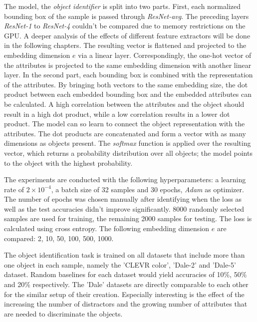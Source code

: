 The model, the \emph{object identifier} is split into two parts.
First, each normalized bounding box of the sample is passed through \emph{ResNet-avg}.
The preceding layers \emph{ResNet-1} to \emph{ResNet-4} couldn't be compared due to memory restrictions on the GPU.
A deeper analysis of the effects of different feature extractors will be done in the following chapters.
The resulting vector is flattened and projected to the embedding dimension $e$ via a linear layer.
Correspondingly, the one-hot vector of the attributes is projected to the same embedding dimension with another linear layer.
In the second part, each bounding box is combined with the representation of the attributes.
By bringing both vectors to the same embedding size, the dot product between each embedded bounding box and the embedded attributes can be calculated.
A high correlation between the attributes and the object should result in a high dot product, while a low correlation results in a lower dot product.
The model can so learn to connect the object representation with the attributes.
The dot products are concatenated and form a vector with as many dimensions as objects present.
The \emph{softmax} function is applied over the resulting vector, which returns a probability distribution over all objects; the model points to the object with the highest probability.

The experiments are conducted with the following hyperparameters: a learning rate of $2\times10^{-4}$, a batch size of 32 samples and 30 epochs, \emph{Adam} \citep{Kingma2015} as optimizer.
The number of epochs was chosen manually after identifying when the loss as well as the test accuracies didn't improve significantly.
8000 randomly selected samples are used for training, the remaining 2000 samples for testing.
The loss is calculated using cross entropy.
The following embedding dimension $e$ are compared: 2, 10, 50, 100, 500, 1000.

The object identification task is trained on all datasets that include more than one object in each sample, namely the 'CLEVR color', 'Dale-2' and 'Dale-5' dataset.
Random baselines for each dataset would yield accuracies of 10\%, 50\% and 20\% respectively.
The 'Dale' datasets are directly comparable to each other for the similar setup of their creation.
Especially interesting is the effect of the increasing the number of distractors and the growing number of attributes that are needed to discriminate the objects.

